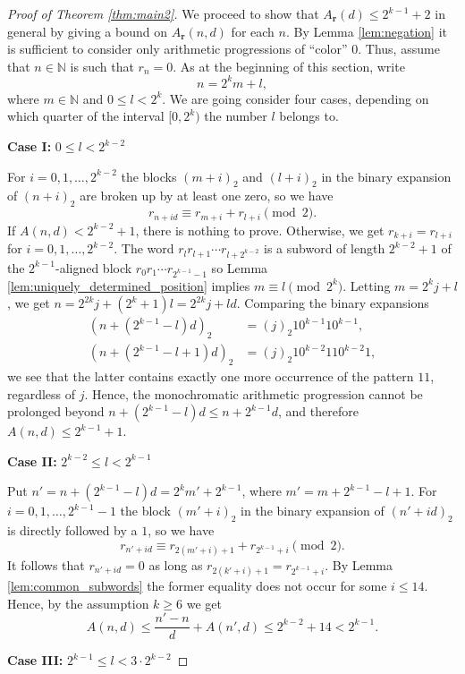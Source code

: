\documentclass[a4paper,11pt]{amsart}
\theoremstyle{definition}
\newcommand{\N}{\mathbb{N}}
\begin{document}
\begin{proof}[Proof of Theorem \ref{thm:main2}]
We proceed to show that $A_{\mathbf{r}}(d) \leq 2^{k-1} + 2$ in general by giving a bound on $A_{\mathbf{r}}(n,d)$ for each $n$. By Lemma \ref{lem:negation} it is sufficient to consider only arithmetic progressions of ``color'' $0$. Thus, assume that $n \in \N$ is such that $r_{n} = 0$. As at the beginning of this section, write 
$$n = 2^k m + l,$$
where $m \in \N$ and $0 \leq l < 2^k$. We are going consider four cases, depending on which quarter of the interval $[0, 2^k)$ the number $l$ belongs to. 

\textbf{Case I:} $0 \leq l < 2^{k-2}$

For  $i=0,1,\ldots,2^{k-2}$  the blocks $(m+i)_2$ and $(l+i)_2$ in the binary expansion of $(n+i)_2$ are broken up by at least one zero, so we have
$$ r_{n+id} \equiv r_{m+i} + r_{l+i} \pmod{2}. $$
If $A(n,d) < 2^{k-2} + 1$, there is nothing to prove.  Otherwise, we get $r_{k+i} = r_{l+i}$ for $i=0,1,\ldots,2^{k-2}$. The word $r_l r_{l+1} \cdots r_{l+2^{k-2}}$ is a subword of length $2^{k-2}+1$ of the $2^{k-1}$-aligned block $r_0 r_{1} \cdots r_{2^{k-1}-1}$ so Lemma \ref{lem:uniquely_determined_position} implies $m \equiv l \pmod{2^k}$. Letting $m = 2^k j + l$, we get $n = 2^{2k} j + (2^k+1)l = 2^{2k} j + ld$.  Comparing the binary expansions 
\begin{align*}
(n + (2^{k-1}-l)d)_2 &= (j)_2 10^{k-1} 1 0^{k-1}, \\
(n + (2^{k-1}-l+1)d)_2 &= (j)_2 10^{k-2}1 1 0^{k-2} 1,
\end{align*}
we see that the latter contains exactly one more occurrence of the pattern $11$, regardless of $j$. Hence, the monochromatic arithmetic progression cannot be prolonged beyond $n + (2^{k-1}-l)d \leq n + 2^{k-1}d$, and therefore $A(n,d) \leq 2^{k-1} + 1$.

\textbf{Case II:} $2^{k-2} \leq l < 2^{k-1}$

Put $n' = n+(2^{k-1} - l)d =  2^k m' + 2^{k-1}$, where $m' = m+2^{k-1} - l+1$. For $i=0,1,\ldots, 2^{k-1} - 1$ the block $(m'+i)_2$ in the binary expansion of $(n'+id)_2$ is directly followed by a $1$, so we have
$$r_{n'+id} \equiv r_{2(m'+i)+1} + r_{2^{k-1}+i}\pmod{2}.$$
It follows that $r_{n'+id} = 0$ as long as $r_{2(k'+i)+1} = r_{2^{k-1}+i}$. By Lemma \ref{lem:common_subwords} the former equality does not occur for some $i \leq 14$. Hence, by the assumption $k \geq 6$ we get  
$$A(n,d) \leq  \frac{n'-n}{d} + A(n',d) \leq  2^{k-2} + 14 < 2^{k-1}.$$

\textbf{Case III:} $2^{k-1} \leq l < 3 \cdot 2^{k-2}$


\end{proof}
\end{document}
